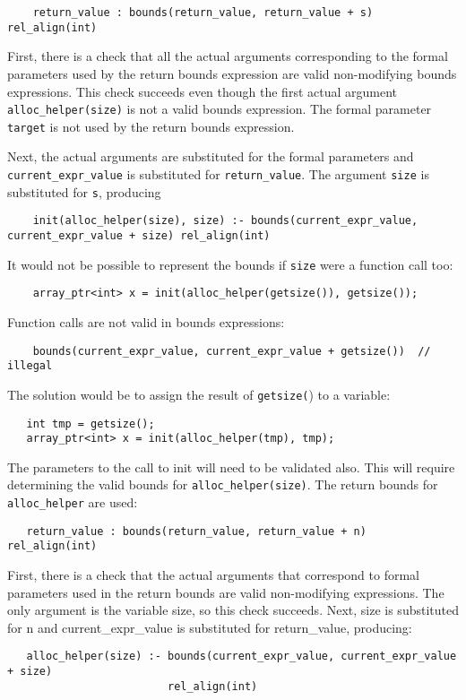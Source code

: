 \begin{verbatim}
    return_value : bounds(return_value, return_value + s) rel_align(int)
\end{verbatim}

First, there is a check that all the actual arguments corresponding to
the formal parameters used by the return bounds expression are valid
non-modifying bounds expressions. This check succeeds even though the
first actual argument \texttt{alloc\_helper(size)} is not a valid bounds
expression. The formal parameter \texttt{target} is not used by the
return bounds expression.

Next, the actual arguments are substituted for the formal parameters and
\texttt{current\_expr\_value} is substituted for \texttt{return\_value}.
The argument \texttt{size} is substituted for \texttt{s}, producing
\begin{verbatim}
    init(alloc_helper(size), size) :- bounds(current_expr_value, current_expr_value + size) rel_align(int)
\end{verbatim}

It would not be possible to represent the bounds if \texttt{size} were a
function call too:
\begin{verbatim}
    array_ptr<int> x = init(alloc_helper(getsize()), getsize());
\end{verbatim}

Function calls are not valid in bounds expressions:

\begin{verbatim}
    bounds(current_expr_value, current_expr_value + getsize())  // illegal
\end{verbatim}

The solution would be to assign the result of \texttt{getsize(}) to a
variable:
\begin{verbatim}
   int tmp = getsize();
   array_ptr<int> x = init(alloc_helper(tmp), tmp);
\end{verbatim}

The parameters to the call to init will need to be validated also. This
will require determining the valid bounds for \texttt{alloc\_helper(size)}. The
return bounds for \texttt{alloc\_helper} are used:
\begin{verbatim}
   return_value : bounds(return_value, return_value + n) rel_align(int)
\end{verbatim}

First, there is a check that the actual arguments that correspond to
formal parameters used in the return bounds are valid non-modifying
expressions. The only argument is the variable size, so this check
succeeds. Next, size is substituted for n and current\_expr\_value is
substituted for return\_value, producing:
\begin{verbatim}
   alloc_helper(size) :- bounds(current_expr_value, current_expr_value + size) 
                         rel_align(int)
\end{verbatim}

